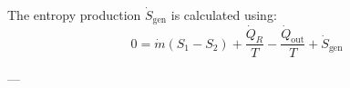 The entropy production \( \dot{S}_{\text{gen}} \) is calculated using:  
\[
0 = \dot{m} \left( S_1 - S_2 \right) + \frac{\dot{Q}_R}{T} - \frac{\dot{Q}_{\text{out}}}{T} + \dot{S}_{\text{gen}}
\]  

---
